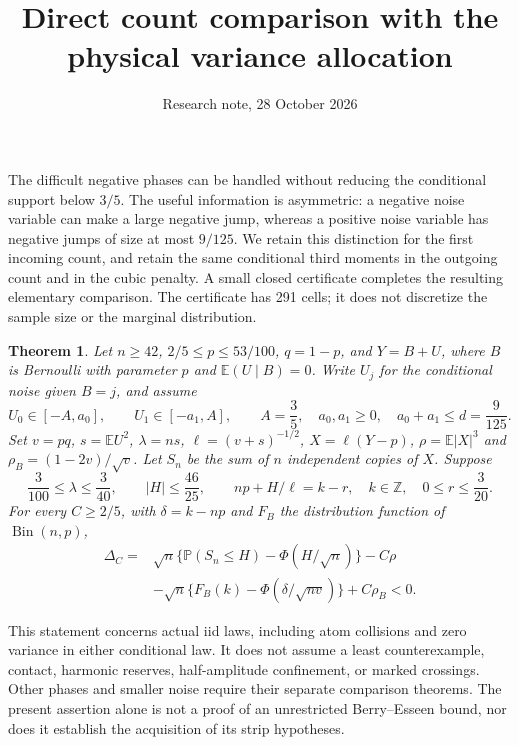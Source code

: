 \documentclass[11pt,a4paper]{article}
\title{Direct count comparison with the physical variance allocation}
\author{Research note, 28 October 2026}\date{}
\newcommand{\E}{\mathbb E}\newcommand{\Pp}{\mathbb P}
\newtheorem{theorem}{Theorem}\newtheorem{lemma}{Lemma}
\begin{document}
\maketitle

The difficult negative phases can be handled without reducing the conditional
support below $3/5$. The useful information is asymmetric: a negative noise
variable can make a large negative jump, whereas a positive noise variable
has negative jumps of size at most $9/125$. We retain this distinction for the
first incoming count, and retain the same conditional third moments in the
outgoing count and in the cubic penalty. A small closed certificate completes
the resulting elementary comparison. The certificate has 291 cells; it does
not discretize the sample size or the marginal distribution.

\begin{theorem}\label{thm:comparison}
Let $n\ge42$, $2/5\le p\le53/100$, $q=1-p$, and $Y=B+U$, where
$B$ is Bernoulli with parameter $p$ and $\E(U\mid B)=0$. Write $U_j$
for the conditional noise given $B=j$, and assume
\[
 U_0\in[-A,a_0],\qquad U_1\in[-a_1,A],\qquad
 A=\frac35,\quad a_0,a_1\ge0,\quad a_0+a_1\le d=\frac9{125}.
\]
Set $v=pq$, $s=\E U^2$, $\lambda=ns$, $\ell=(v+s)^{-1/2}$,
$X=\ell(Y-p)$, $\rho=\E|X|^3$ and $\rho_B=(1-2v)/\sqrt v$.
Let $S_n$ be the sum of $n$ independent copies of $X$. Suppose
\[
 \frac3{100}\le\lambda\le\frac3{40},\qquad |H|\le\frac{46}{25},
 \qquad np+H/\ell=k-r,\quad k\in\mathbb Z,\quad0\le r\le\frac3{20}.
\]
For every $C\ge2/5$, with $\delta=k-np$ and $F_B$ the distribution
function of $\operatorname{Bin}(n,p)$,
\begin{align*}
\Delta_C={}&\sqrt n\{\Pp(S_n\le H)-\Phi(H/\sqrt n)\}-C\rho\\
 &-\sqrt n\{F_B(k)-\Phi(\delta/\sqrt{nv})\}+C\rho_B<0.
\end{align*}
\end{theorem}

This statement concerns actual iid laws, including atom collisions and zero
variance in either conditional law. It does not assume a least counterexample,
contact, harmonic reserves, half-amplitude confinement, or marked crossings.
Other phases and smaller noise require their separate comparison theorems.
The present assertion alone is not a proof of an unrestricted Berry--Esseen
bound, nor does it establish the acquisition of its strip hypotheses.
\end{document}
